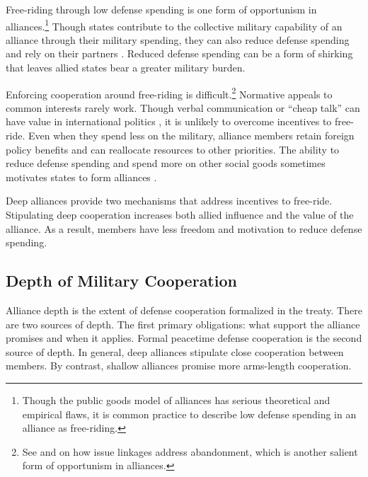 \documentclass[12pt]{article}
\begin{document}
Free-riding through low defense spending is one form of opportunism in alliances.\footnote{Though the public goods model of alliances has serious theoretical and empirical flaws, it is common practice to describe low defense spending in an alliance as free-riding.}
Though states contribute to the collective military capability of an alliance through their military spending, they can also reduce defense spending and rely on their partners \citep{OlsonZeckhauser1966, Morrow1993, Conybeare1994, SandlerHartley2001}.
Reduced defense spending can be a form of shirking that leaves allied states bear a greater military burden. 


Enforcing cooperation around free-riding is difficult.\footnote{See \citet{Poast2012, Poast2013} and \citet{LongLeeds2006} on how issue linkages address abandonment, which is another salient form of opportunism in alliances.}
Normative appeals to common interests rarely work. 
Though verbal communication or ``cheap talk'' can have value in international politics \citep{Trager2010}, it is unlikely to overcome incentives to free-ride. 
Even when they spend less on the military, alliance members retain foreign policy benefits and can reallocate resources to other priorities. 
The ability to reduce defense spending and spend more on other social goods sometimes motivates states to form alliances \citep{Kimball2010, AllenDigiuseppe2013}. 


Deep alliances provide two mechanisms that address incentives to free-ride. 
Stipulating deep cooperation increases both allied influence and the value of the alliance. 
As a result, members have less freedom and motivation to reduce defense spending. 



\subsection{Depth of Military Cooperation} 


Alliance depth is the extent of defense cooperation formalized in the treaty. 
There are two sources of depth. 
The first primary obligations: what support the alliance promises and when it applies. 
Formal peacetime defense cooperation is the second source of depth. 
In general, deep alliances stipulate close cooperation between members.
By contrast, shallow alliances promise more arms-length cooperation. 
\end{document}
